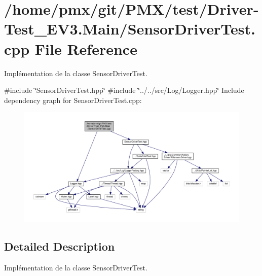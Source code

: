 \hypertarget{Driver-Test__EV3_8Main_2SensorDriverTest_8cpp}{}\section{/home/pmx/git/\+P\+M\+X/test/\+Driver-\/\+Test\+\_\+\+E\+V3.Main/\+Sensor\+Driver\+Test.cpp File Reference}
\label{Driver-Test__EV3_8Main_2SensorDriverTest_8cpp}


Implémentation de la classe Sensor\+Driver\+Test.  


{\ttfamily \#include \char`\"{}Sensor\+Driver\+Test.\+hpp\char`\"{}}\newline
{\ttfamily \#include \char`\"{}../../src/\+Log/\+Logger.\+hpp\char`\"{}}\newline
Include dependency graph for Sensor\+Driver\+Test.\+cpp\+:
\nopagebreak
\begin{figure}[H]
\begin{center}
\leavevmode
\includegraphics[width=350pt]{Driver-Test__EV3_8Main_2SensorDriverTest_8cpp__incl}
\end{center}
\end{figure}


\subsection{Detailed Description}
Implémentation de la classe Sensor\+Driver\+Test. 

